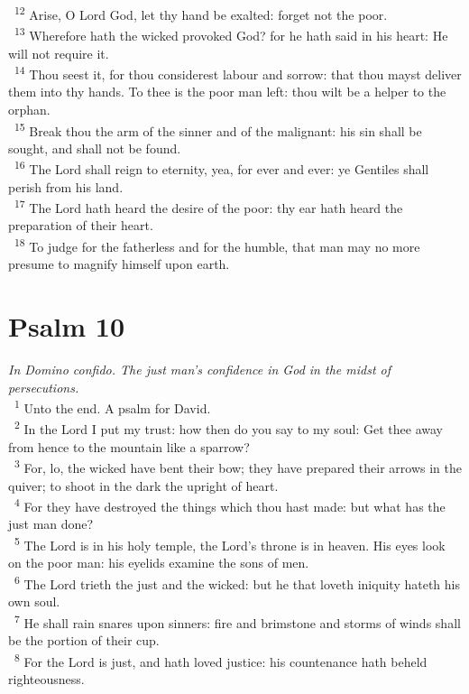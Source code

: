 \documentclass[a5paper,12pt]{article}
\begin{document}
\begin{multicols*}{2}
~\textsuperscript{12} Arise, O Lord God, let thy hand be exalted: forget not the poor.\\
~\textsuperscript{13} Wherefore hath the wicked provoked God? for he hath said in his heart: He will not require it.\\
~\textsuperscript{14} Thou seest it, for thou considerest labour and sorrow: that thou mayst deliver them into thy hands. To thee is the poor man left: thou wilt be a helper to the orphan.\\
~\textsuperscript{15} Break thou the arm of the sinner and of the malignant: his sin shall be sought, and shall not be found.\\
~\textsuperscript{16} The Lord shall reign to eternity, yea, for ever and ever: ye Gentiles shall perish from his land.\\
~\textsuperscript{17} The Lord hath heard the desire of the poor: thy ear hath heard the preparation of their heart.\\
~\textsuperscript{18} To judge for the fatherless and for the humble, that man may no more presume to magnify himself upon earth.\\

\section{Psalm 10}
\label{sec:orgcae8f51}
\emph{In Domino confido. The just man's confidence in God in the midst of persecutions.}\\

~\textsuperscript{1} Unto the end. A psalm for David.\\
~\textsuperscript{2} In the Lord I put my trust: how then do you say to my soul: Get thee away from hence to the mountain like a sparrow?\\
~\textsuperscript{3} For, lo, the wicked have bent their bow; they have prepared their arrows in the quiver; to shoot in the dark the upright of heart.\\
~\textsuperscript{4} For they have destroyed the things which thou hast made: but what has the just man done?\\
~\textsuperscript{5} The Lord is in his holy temple, the Lord's throne is in heaven. His eyes look on the poor man: his eyelids examine the sons of men.\\
~\textsuperscript{6} The Lord trieth the just and the wicked: but he that loveth iniquity hateth his own soul.\\
~\textsuperscript{7} He shall rain snares upon sinners: fire and brimstone and storms of winds shall be the portion of their cup.\\
~\textsuperscript{8} For the Lord is just, and hath loved justice: his countenance hath beheld righteousness.\\


\end{multicols*}
\end{document}
